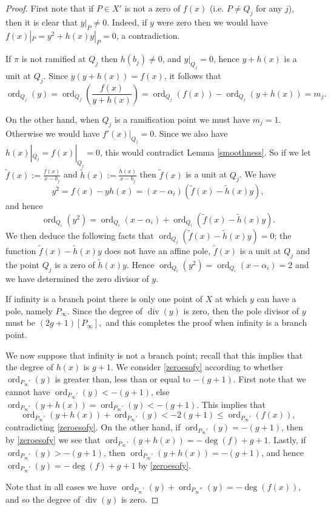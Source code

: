 \documentclass[11pt]{article} %
\theoremstyle{plain}
\theoremstyle{remark}
\DeclareMathOperator{\ord}{ord}
\DeclareMathOperator{\di}{div}
\begin{document}
\begin{proof}
 First note that if $P\in X'$ is not a zero of $f(x)$ (i.e. $P\neq Q_j$ for any $j$), then it is clear that $y|_P \neq 0$.
 Indeed, if $y$ were zero then we would have $f(x)|_P = y^2 + h(x)y|_P = 0$, a contradiction.
 
 If $\pi$ is not ramified at $Q_j$ then $h(b_j) \neq 0$, and $y|_{Q_j} = 0$, hence $y+h(x)$ is a unit at $Q_j$.
 Since $y(y+h(x)) = f(x)$, it follows that
 \begin{equation}\label{zeroesofy}
  \ord_{Q_j}(y) = \ord_{Q_j}\left(\frac{f(x)}{y+h(x)}\right) = \ord_{Q_j}(f(x)) -\ord_{Q_j}(y+h(x)) = m_j.
 \end{equation}

 On the other hand, when $Q_j$ is a ramification point we must have $m_j=1$.
 Otherwise we would have $f'(x)|_{Q_j} = 0$.
Since we also have $h(x)|_{Q_j} = f(x)|_{Q_j} = 0$, this would contradict Lemma \ref{smoothness}.
 So if we let $\tilde f(x) := \frac{f(x)}{x-b_j}$ and $\tilde h(x) := \frac{h(x)}{x-b_j}$ then $\tilde f(x)$ is a unit at $Q_j$.
We have \[y^2 = f(x) - yh(x) = (x-\alpha_i)(\tilde f(x) - \tilde h(x)y),\]
 and hence
 \begin{equation*}
   \ord_{Q_i}(y^2) = \ord_{Q_i}(x-\alpha_i) + \ord_{Q_i}(\tilde f(x) - \tilde h(x)y).
  \end{equation*}
We then deduce the following facts that $\ord_{Q_j}(\tilde f(x)-\tilde h(x)y) = 0$; the function $\tilde f(x) - \tilde h(x)y$ does not have an affine pole, $\tilde f(x)$ is a unit at $Q_j$ and the point $Q_j$ is a zero of $\tilde h(x)y$.
Hence $\ord_{Q_i}(y^2) = \ord_{Q_i}(x-\alpha_i) = 2$ and we have determined the zero divisor of $y$. 


If infinity is a branch point there is only one point of $X$ at which $y$ can have a pole, namely $P_\infty$.
Since the degree of $\di (y)$ is zero, then the pole divisor of $y$ must be
$
 (2g+1)[P_\infty],
$
and this completes the proof when infinity is a branch point.

We now suppose that infinity is not a branch point; recall that this implies that the degree of $h(x)$ is $g+1$.
We consider \eqref{zeroesofy} according to whether $\ord_{P_\infty'}(y)$ is greater than, less than or equal to $-(g+1)$.
First note that we cannot have $\ord_{P_\infty'}(y) < -(g+1)$, else $\ord_{P_\infty'}(y+h(x)) = \ord_{P_\infty'}(y)< -(g+1)$.
This implies that \[ \ord_{P_\infty'}(y+h(x)) + \ord_{P_\infty'}(y) < -2(g+1) \leq \ord_{P_\infty'}(f(x)), \] contradicting \eqref{zeroesofy}.
On the other hand, if $\ord_{P_\infty'} (y) = -(g+1)$, then by \eqref{zeroesofy} we see that $\ord_{P_\infty'}(y+h(x)) = -\deg(f) +g+1$.
Lastly, if $\ord_{P_\infty'}(y) > -(g+1)$, then $\ord_{P_\infty'}(y+h(x)) = -(g+1)$, and hence $\ord_{P_\infty'} (y) = -\deg(f) +g+1$ by \eqref{zeroesofy}.

Note that in all cases we have $\ord_{P_\infty'}(y) + \ord_{P_\infty''}(y) = -\deg(f(x))$, and so the degree of $\di (y)$ is zero.
\end{proof}
\end{document}
